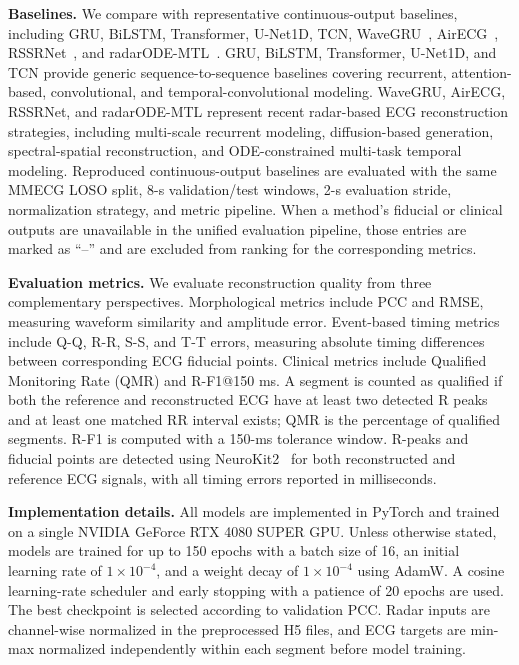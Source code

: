 \documentclass[runningheads]{llncs}
\begin{document}
\noindent\textbf{Baselines.}
We compare with representative continuous-output baselines, including GRU, BiLSTM, Transformer, U-Net1D, TCN, WaveGRU~\cite{wavegru2025}, AirECG~\cite{airecg}, RSSRNet~\cite{rssrnet}, and radarODE-MTL~\cite{radarodemt}. GRU, BiLSTM, Transformer, U-Net1D, and TCN provide generic sequence-to-sequence baselines covering recurrent, attention-based, convolutional, and temporal-convolutional modeling. WaveGRU, AirECG, RSSRNet, and radarODE-MTL represent recent radar-based ECG reconstruction strategies, including multi-scale recurrent modeling, diffusion-based generation, spectral-spatial reconstruction, and ODE-constrained multi-task temporal modeling. Reproduced continuous-output baselines are evaluated with the same MMECG LOSO split, 8-s validation/test windows, 2-s evaluation stride, normalization strategy, and metric pipeline. When a method's fiducial or clinical outputs are unavailable in the unified evaluation pipeline, those entries are marked as ``--'' and are excluded from ranking for the corresponding metrics.

\noindent\textbf{Evaluation metrics.}
We evaluate reconstruction quality from three complementary perspectives. Morphological metrics include PCC and RMSE, measuring waveform similarity and amplitude error. Event-based timing metrics include Q-Q, R-R, S-S, and T-T errors, measuring absolute timing differences between corresponding ECG fiducial points. Clinical metrics include Qualified Monitoring Rate (QMR) and R-F1@150 ms. A segment is counted as qualified if both the reference and reconstructed ECG have at least two detected R peaks and at least one matched RR interval exists; QMR is the percentage of qualified segments. R-F1 is computed with a 150-ms tolerance window. R-peaks and fiducial points are detected using NeuroKit2~\cite{neurokit2} for both reconstructed and reference ECG signals, with all timing errors reported in milliseconds.

\noindent\textbf{Implementation details.}
All models are implemented in PyTorch and trained on a single NVIDIA GeForce RTX 4080 SUPER GPU. Unless otherwise stated, models are trained for up to 150 epochs with a batch size of 16, an initial learning rate of $1\times10^{-4}$, and a weight decay of $1\times10^{-4}$ using AdamW. A cosine learning-rate scheduler and early stopping with a patience of 20 epochs are used. The best checkpoint is selected according to validation PCC. Radar inputs are channel-wise normalized in the preprocessed H5 files, and ECG targets are min-max normalized independently within each segment before model training.
\end{document}

